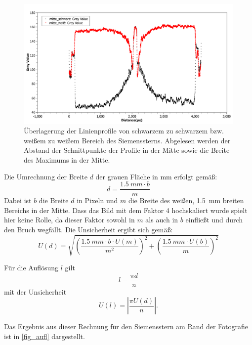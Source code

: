 \documentclass[
	a4paper,
	12pt,
	pagesize,
	ngerman
]{scrartcl}
\begin{document}
	\begin{figure}[H]  
		\includegraphics[width=1\textwidth]{fig_Einzellinse_Linienprofil}%
		\centering
		\caption{
			Überlagerung der Linienprofile von schwarzem zu schwarzem bzw. weißem zu weißem Bereich des Siemenssterns.
			Abgelesen werden der Abstand der Schnittpunkte der Profile in der Mitte sowie die Breite des Maximums in der Mitte.
		}
		\label{fig_einzel_linie}
		\centering
	\end{figure}
	
	Die Umrechnung der Breite $d$ der grauen Fläche in \si{mm} erfolgt gemäß:
	\begin{equation}
		d = \frac{\SI{1,5}{mm} \cdot b}{m}
	\end{equation}
	Dabei ist $b$ die Breite $d$ in Pixeln und $m$ die Breite des weißen, \SI{1,5}{mm} breiten Bereichs in der Mitte.
	Dass das Bild mit dem Faktor 4 hochskaliert wurde spielt hier keine Rolle, da dieser Faktor sowohl in $m$ als auch in $b$ einfließt und durch den Bruch wegfällt.
	Die Unsicherheit ergibt sich gemäß:
	\begin{equation}
		U(d)=\sqrt{\left(\frac{\SI{1,5}{mm} \cdot b \cdot U(m)}{m^2}\right)^2+\left(\frac{\SI{1,5}{mm} \cdot U(b)}{m}\right)^2}
	\end{equation}
	
	Für die Auflösung $l$ gilt
	\begin{equation}
		l=\frac{\pi d}{n}
	\end{equation}
	mit der Unsicherheit
	\begin{equation}
		U(l)=\left|\frac{\pi U(d)}{n}\right|. %
	\end{equation}
	
	Das Ergebnis aus dieser Rechnung für den Siemensstern am Rand der Fotografie ist in \cref{fig_aufl} dargestellt.
	
\end{document}
